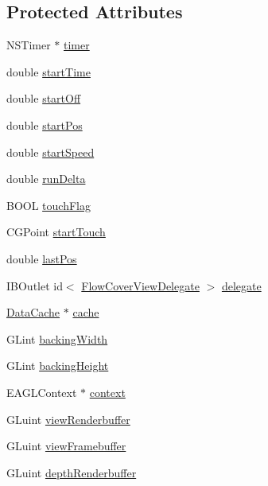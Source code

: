 \subsection*{Protected Attributes}
\begin{DoxyCompactItemize}
\item 
NSTimer $\ast$ \hyperlink{interface_flow_cover_view_a49efd1a3e05e38497c176a4e11fdbaab}{timer}
\item 
double \hyperlink{interface_flow_cover_view_a0a07a521d3525b9b7dc70c0a625adea0}{startTime}
\item 
double \hyperlink{interface_flow_cover_view_a940d757461ee76fd56faddb9b5599771}{startOff}
\item 
double \hyperlink{interface_flow_cover_view_a55ce5cf7840850f6ed838404916a48ba}{startPos}
\item 
double \hyperlink{interface_flow_cover_view_a35a653c4b8539d4059c697f60c81fa1d}{startSpeed}
\item 
double \hyperlink{interface_flow_cover_view_a800395a77f71778e7c0dc0bd16ba352d}{runDelta}
\item 
BOOL \hyperlink{interface_flow_cover_view_a1a25ad3e6c05c8e905d31e7a9dcbce20}{touchFlag}
\item 
CGPoint \hyperlink{interface_flow_cover_view_acaf7025590c212741e6217f30fb042be}{startTouch}
\item 
double \hyperlink{interface_flow_cover_view_ad65e2b4a144cd8065f78983d6130534a}{lastPos}
\item 
IBOutlet id$<$ \hyperlink{protocol_flow_cover_view_delegate-p}{FlowCoverViewDelegate} $>$ \hyperlink{interface_flow_cover_view_ad6e325e8aedd2961604d7099532f48e8}{delegate}
\item 
\hyperlink{interface_data_cache}{DataCache} $\ast$ \hyperlink{interface_flow_cover_view_ab4f53a1cd1e7112495a5d9db8eb780c8}{cache}
\item 
GLint \hyperlink{interface_flow_cover_view_acef316e43bd2cab027258e37efe3f1ce}{backingWidth}
\item 
GLint \hyperlink{interface_flow_cover_view_a0eaf51a70ed8a324697a1de075bf013d}{backingHeight}
\item 
EAGLContext $\ast$ \hyperlink{interface_flow_cover_view_a65e9007d4e86c1deff1cdfeaf19556ff}{context}
\item 
GLuint \hyperlink{interface_flow_cover_view_a0b132c2e2c9e93be7eff4b1d12644922}{viewRenderbuffer}
\item 
GLuint \hyperlink{interface_flow_cover_view_ab782ac2fa71bae57432171d6ee8a0933}{viewFramebuffer}
\item 
GLuint \hyperlink{interface_flow_cover_view_aa7c9cf3bf8b4be70bb35f472b8a45eda}{depthRenderbuffer}
\end{DoxyCompactItemize}
